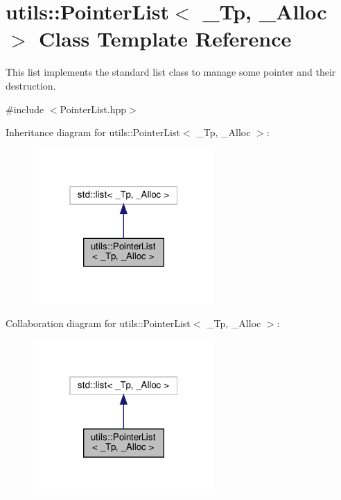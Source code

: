 \hypertarget{classutils_1_1PointerList}{}\section{utils\+:\+:Pointer\+List$<$ \+\_\+\+Tp, \+\_\+\+Alloc $>$ Class Template Reference}
\label{classutils_1_1PointerList}


This list implements the standard list class to manage some pointer and their destruction.  




{\ttfamily \#include $<$Pointer\+List.\+hpp$>$}



Inheritance diagram for utils\+:\+:Pointer\+List$<$ \+\_\+\+Tp, \+\_\+\+Alloc $>$\+:
\nopagebreak
\begin{figure}[H]
\begin{center}
\leavevmode
\includegraphics[width=196pt]{classutils_1_1PointerList__inherit__graph}
\end{center}
\end{figure}


Collaboration diagram for utils\+:\+:Pointer\+List$<$ \+\_\+\+Tp, \+\_\+\+Alloc $>$\+:
\nopagebreak
\begin{figure}[H]
\begin{center}
\leavevmode
\includegraphics[width=196pt]{classutils_1_1PointerList__coll__graph}
\end{center}
\end{figure}

